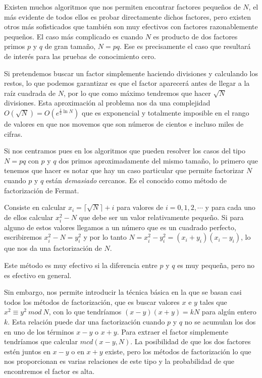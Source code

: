 \hfil

Existen muchos algoritmos que nos permiten encontrar factores peque\~nos de $N$,
el m\'as evidente de todos ellos es probar directamente dichos factores, pero existen otros
m\'as sofisticados que tambi\'en son muy efectivos con factores razonablemente
peque\~nos. El caso m\'as complicado es cuando $N$ es producto de dos factores primos $p$ y $q$
de gran tama\~no, $N = pq$. Ese es precisamente el caso que resultar\'a de
inter\'es para las pruebas de conocimiento cero.

Si pretendemos buscar un factor simplemente haciendo divisiones y calculando los
restos, lo que podemos garantizar es que el factor aparecer\'a antes de llegar a
la ra\'iz cuadrada de $N$, por lo que como m\'aximo tendremos que hacer $\sqrt{N}$
divisiones. Esta aproximaci\'on al problema nos da una complejidad
$O(\sqrt{N}) = O(e^{\frac{1}{2}\ln N})$ que es exponencial y totalmente imposible
en el rango de valores en que nos movemos que son n\'umeros de cientos e incluso
miles de cifras.

Si nos centramos pues en los algoritmos que pueden resolver los casos del tipo
$N = pq$ con $p$ y $q$ dos primos aproximadamente del mismo tama\~no, lo primero que tenemos que
hacer es notar que hay un caso particular que permite factorizar $N$ cuando $p$
y $q$ est\'an {\em demasiado} cercanos. Es el conocido como m\'etodo de factorizaci\'on
de Fermat.

Consiste en calcular $x_i = \lceil\sqrt{N}\rceil + i$ para valores de $i = 0,1,2,\cdots$
y para cada uno de ellos calcular $x_i^2 - N$ que debe ser un valor relativamente peque\~no.
Si para alguno de estos valores llegamos a un n\'umero que es un cuadrado perfecto,
escribiremos $x_i^2 - N = y_i^2$ y por lo tanto $N = x_i^2 - y_i^2 =
(x_i + y_i)(x_i - y_i)$, lo que nos da una factorizaci\'on de $N$.

Este m\'etodo es muy efectivo si la diferencia entre $p$ y $q$ es muy peque\~na, pero no
es efectivo en general.

Sin embargo, nos permite introducir la t\'ecnica b\'asica en la que se basan casi
todos los m\'etodos de factorizaci\'on, que es buscar valores $x$ e $y$ tales que
$x^2 \equiv y^2 ~mod~N$, con lo que tendr\'iamos $(x-y)(x+y) = kN$ para alg\'un entero $k$.
Esta relaci\'on puede dar una factorizaci\'on cuando $p$ y $q$ no se acumulan los dos en
uno de los t\'erminos $x-y$ o $x+y$. Para extraer el factor simplemente tendr\'iamos que
calcular $mcd(x-y,N)$. La posibilidad de que los dos factores est\'en juntos en $x-y$ o
en $x+y$ existe, pero los m\'etodos de factorizaci\'on lo que nos proporcionan es
varias relaciones de este tipo y la probabilidad de que encontremos el factor es alta.


